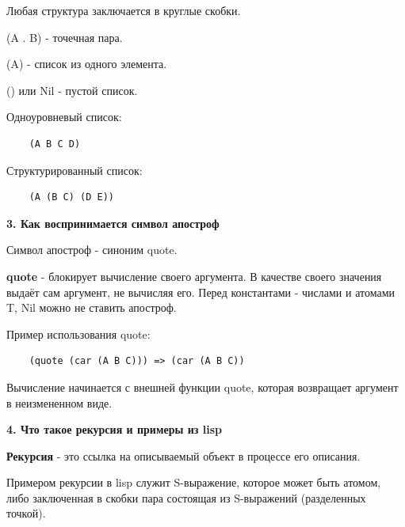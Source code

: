 Любая структура заключается в круглые скобки.

(A . B) - точечная пара.

(A) - список из одного элемента.

() или Nil - пустой список.

Одноуровневый список:
\begin{lstlisting}
	(A B C D)
\end{lstlisting}

Структурированный список:
\begin{lstlisting}
	(A (B C) (D E))
\end{lstlisting}

\textbf{3. Как воспринимается символ апостроф}

Символ апостроф - синоним quote.

\textbf{quote} - блокирует вычисление своего аргумента.
В качестве своего значения выдаёт сам аргумент, не вычисляя его.
Перед константами - числами и атомами T, Nil можно не ставить апостроф.

Пример использования quote:
\begin{lstlisting}
	(quote (car (A B C))) => (car (A B C))
\end{lstlisting}


Вычисление начинается с внешней функции quote, которая возвращает аргумент в неизмененном виде.

\textbf{4. Что такое рекурсия и примеры из lisp}

\textbf{Рекурсия} - это ссылка на описываемый объект в процессе его описания.

Примером рекурсии в lisp служит S-выражение, которое может быть атомом,
либо заключенная в скобки пара состоящая из S-выражений (разделенных точкой).


